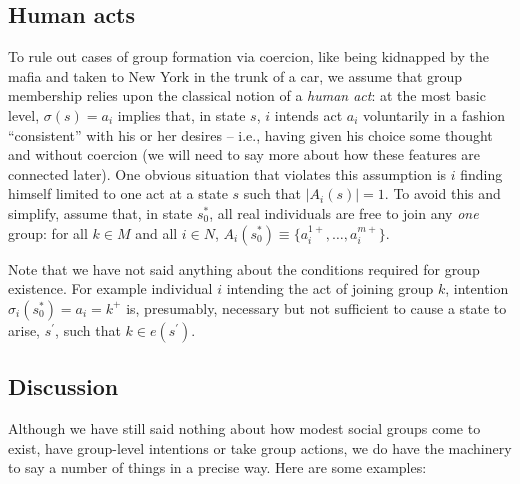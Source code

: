 \documentclass[
11pt,
titlepage,
reqno,
]{article}%
\theoremstyle{definition}
\begin{document}
	
	\subsection{Human acts\label{human acts}}
	To rule out cases of group formation via coercion, like being kidnapped by the mafia and taken to New York in the trunk of a car, we assume that group membership relies upon the classical notion of a \textit{human act}: at the most basic level, $\sigma( s)=a_i$ implies that, in state $ s$, $i$ intends act $a_i$ voluntarily in a fashion ``consistent'' with his or her desires -- i.e., having given his choice some thought and without coercion (we will need to say more about how these features are connected later). One obvious situation that violates this assumption is $i$ finding himself limited to one act at a state $ s$ such that $|A_i(s)|=1$. To avoid this and simplify, assume that, in state $s_0^\ast$, all real individuals are free to join any \textit{one} group: for all $k\in M$ and all $i\in N$, $A_i(s_0^\ast)\equiv \{a_i^{1+},\ldots,a_i^{m+}\}$.
	
	Note that we have not said anything about the conditions required for group existence. For example individual $i$ intending the act of joining  group $k$, intention $\sigma_i(s_0^\ast)=a_i=k^+$ is, presumably, necessary but not sufficient to cause a state to arise, $ s^\prime$, such that $k\in e(s^\prime)$. 
	
	
	
	\subsection{Discussion}
	
	Although we have still said nothing about how modest social groups come to exist, have group-level intentions or take group actions, we do have the machinery to say a number of things in a precise way. Here are some examples:
	
\end{document}
